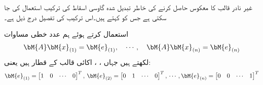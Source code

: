 غیر نادر  قالب   کا معکوس حاصل  کرنے کی خاطر تبدیل شدہ  گاوسی اسقاط کی ترکیب استعمال کی جا سکتی ہے جس کو  کہتے ہیں۔اس ترکیب کی تفصیل درج ذیل ہے۔

 استعمال کرتے ہوئے ہم  عدد خطی مساوات
\begin{align*}
\bM{A}\bM{x}_{(1)}=\bM{e}_{(1)},\quad \cdots,\quad  \bM{A}\bM{x}_{(n)}=\bM{e}_{(n)}
\end{align*}
لکھتے ہیں جہاں ، ،  اکائی  قالب  کے قطار ہیں یعنی:
\begin{align*}
\bM{e}_{(1)}=\begin{bmatrix}1&0&\cdots&0\end{bmatrix}^T,\, \bM{e}_{(2)}=\begin{bmatrix}0&1&\cdots&0\end{bmatrix}^T,\, \cdots,\bM{e}_{(n)}=\begin{bmatrix}0&0&\cdots&1\end{bmatrix}^T
\end{align*} 
